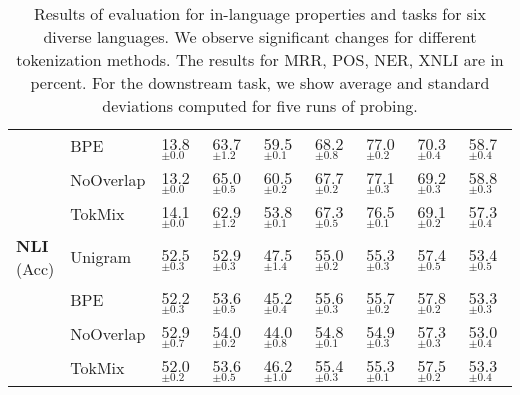 \begin{table*}
\begin{tabular}{lllllllll}
     & BPE &  13.8 $_{\pm0.0}$ &  63.7 $_{\pm1.2}$ &  59.5 $_{\pm0.1}$ &  68.2 $_{\pm0.8}$ &  77.0 $_{\pm0.2}$ &  70.3 $_{\pm0.4}$ &  58.7 $_{\pm0.4}$ \\
     & NoOverlap &  13.2 $_{\pm0.0}$ &  65.0 $_{\pm0.5}$ &  60.5 $_{\pm0.2}$ &  67.7 $_{\pm0.2}$ &  77.1 $_{\pm0.3}$ &  69.2 $_{\pm0.3}$ &  58.8 $_{\pm0.3}$ \\
     & TokMix &  14.1 $_{\pm0.0}$ &  62.9 $_{\pm1.2}$ &  53.8 $_{\pm0.1}$ &  67.3 $_{\pm0.5}$ &  76.5 $_{\pm0.1}$ &  69.1 $_{\pm0.2}$ &  57.3 $_{\pm0.4}$ \\
\cline{1-9}
\multirowcell{4}[0pt][l]{\textbf{NLI} \\ (Acc)} & Unigram &  52.5 $_{\pm0.3}$ &  52.9 $_{\pm0.3}$ &  47.5 $_{\pm1.4}$ &  55.0 $_{\pm0.2}$ &  55.3 $_{\pm0.3}$ &  57.4 $_{\pm0.5}$ &  53.4 $_{\pm0.5}$ \\
     & BPE &  52.2 $_{\pm0.3}$ &  53.6 $_{\pm0.5}$ &  45.2 $_{\pm0.4}$ &  55.6 $_{\pm0.3}$ &  55.7 $_{\pm0.2}$ &  57.8 $_{\pm0.2}$ &  53.3 $_{\pm0.3}$ \\
     & NoOverlap &  52.9 $_{\pm0.7}$ &  54.0 $_{\pm0.2}$ &  44.0 $_{\pm0.8}$ &  54.8 $_{\pm0.1}$ &  54.9 $_{\pm0.3}$ &  57.3 $_{\pm0.3}$ &  53.0 $_{\pm0.4}$ \\
     & TokMix &  52.0 $_{\pm0.2}$ &  53.6 $_{\pm0.5}$ &  46.2 $_{\pm1.0}$ &  55.4 $_{\pm0.3}$ &  55.3 $_{\pm0.1}$ &  57.5 $_{\pm0.2}$ &  53.3 $_{\pm0.4}$ \\
\bottomrule
\end{tabular}
\caption{Results of evaluation for in-language properties and tasks for six diverse languages. We observe significant changes for different tokenization methods. The results for MRR, POS, NER, XNLI are in percent. For the downstream task, we show average and standard deviations computed for five runs of probing.}
\label{tab:in_lang}
\end{table*}
